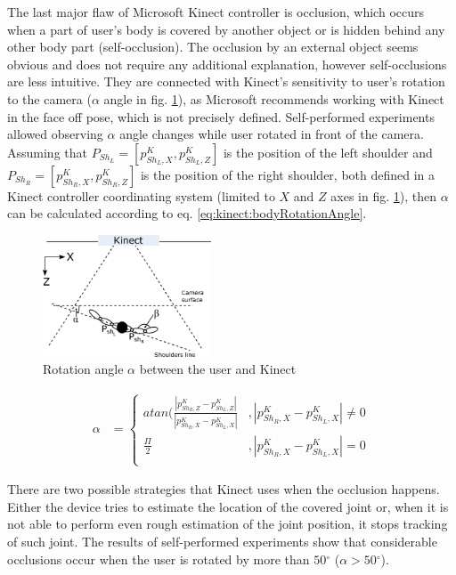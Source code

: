 \documentclass[sensors,article,submit,moreauthors,pdftex,10pt,a4paper]{mdpi}
\newcommand{\degree}{\ensuremath{{}^{\circ}}\xspace}
\begin{document}
The last major flaw of Microsoft Kinect controller is occlusion, which occurs when a part of user’s body is covered by another object or is hidden behind any other body part (self-occlusion). The occlusion by an external object seems obvious and does not require any additional explanation, however self-occlusions are less intuitive. They are connected with Kinect’s sensitivity to user’s rotation to the camera ($\alpha$ angle in fig. \ref{fig:kinect:rotationAngle}), as Microsoft recommends working with Kinect in the face off pose, which is not precisely defined. Self-performed experiments allowed observing $\alpha$ angle changes while user rotated in front of the camera. Assuming that $P_{Sh_L} = [p^K_{{Sh}_L,X} , p^K_{{Sh}_L,Z}]$ is the position of the left shoulder and $P_{Sh_R} = [p^K_{{Sh}_R,X} , p^K_{{Sh}_R,Z}]$ is the position of the right shoulder, both defined in a Kinect controller coordinating system (limited to $X$ and $Z$ axes in fig. \ref{fig:kinect:rotationAngle}), then $\alpha$ can be calculated according to eq. \ref{eq:kinect:bodyRotationAngle}.
	
\begin{figure}[H] %
	\centering
	\includegraphics[width=5cm]{Figure3.png}
	\caption{Rotation angle $\alpha$ between the user and Kinect}
	\label{fig:kinect:rotationAngle}
\end{figure}
	
\begin{equation}
	\label{eq:kinect:bodyRotationAngle}
	\begin{split}
		\alpha &= 
		\begin{cases} 
			atan(\frac{|p^K_{{Sh}_R,Z} - p^K_{{Sh}_L,Z}|}{|p^K_{{Sh}_R,X} - p^K_{{Sh}_L,X}|} & , |p^K_{{Sh}_R,X} - p^K_{{Sh}_L,X}| \neq 0 \\
			\frac{\Pi}{2}                                                                    & , |p^K_{{Sh}_R,X} - p^K_{{Sh}_L,X}| = 0    \\		
		\end{cases}
	\end{split}
\end{equation}
	
There are two possible strategies that Kinect uses when the occlusion happens. Either the device tries to estimate the location of the covered joint or, when it is not able to perform even rough estimation of the joint position, it stops tracking of such joint. The results of self-performed experiments show that considerable occlusions occur when the user is rotated by more than $50\degree$ ($\alpha > 50\degree$). 
	
\end{document}
